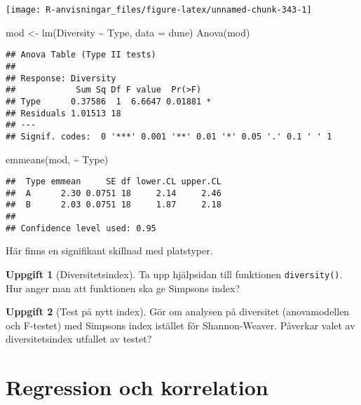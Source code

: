 \documentclass[
]{book}
\newenvironment{Shaded}{\begin{snugshade}}{\end{snugshade}}
\newcommand{\AttributeTok}[1]{\textcolor[rgb]{0.77,0.63,0.00}{#1}}
\newcommand{\FunctionTok}[1]{\textcolor[rgb]{0.00,0.00,0.00}{#1}}
\newcommand{\NormalTok}[1]{#1}
\newcommand{\OtherTok}[1]{\textcolor[rgb]{0.56,0.35,0.01}{#1}}
\newcommand{\SpecialCharTok}[1]{\textcolor[rgb]{0.00,0.00,0.00}{#1}}
\theoremstyle{definition}
\theoremstyle{definition}
\theoremstyle{definition}
\newtheorem{exercise}{Uppgift}[chapter]
\theoremstyle{definition}
\theoremstyle{remark}
\begin{document}
\begin{center}\texttt{[image: R-anvisningar\_files/figure-latex/unnamed-chunk-343-1]} \end{center}

\begin{Shaded}
\begin{Highlighting}[]
\NormalTok{mod }\OtherTok{\textless{}{-}} \FunctionTok{lm}\NormalTok{(Diversity }\SpecialCharTok{\textasciitilde{}}\NormalTok{ Type, }\AttributeTok{data =}\NormalTok{ dune)}
\FunctionTok{Anova}\NormalTok{(mod)}
\end{Highlighting}
\end{Shaded}

\begin{verbatim}
## Anova Table (Type II tests)
## 
## Response: Diversity
##            Sum Sq Df F value  Pr(>F)  
## Type      0.37586  1  6.6647 0.01881 *
## Residuals 1.01513 18                  
## ---
## Signif. codes:  0 '***' 0.001 '**' 0.01 '*' 0.05 '.' 0.1 ' ' 1
\end{verbatim}

\begin{Shaded}
\begin{Highlighting}[]
\FunctionTok{emmeans}\NormalTok{(mod, }\SpecialCharTok{\textasciitilde{}}\NormalTok{ Type)}
\end{Highlighting}
\end{Shaded}

\begin{verbatim}
##  Type emmean     SE df lower.CL upper.CL
##  A      2.30 0.0751 18     2.14     2.46
##  B      2.03 0.0751 18     1.87     2.18
## 
## Confidence level used: 0.95
\end{verbatim}

Här finns en signifikant skillnad med platstyper.

\begin{exercise}[Diversitetsindex]
Ta upp hjälpsidan till funktionen \texttt{diversity()}. Hur anger man att funktionen ska ge Simpsons index?
\end{exercise}

\begin{exercise}[Test på nytt index]
Gör om analysen på diversitet (anovamodellen och F-testet) med Simpsons index istället för Shannon-Weaver. Påverkar valet av diversitetsindex utfallet av testet?
\end{exercise}

\hypertarget{regression-och-korrelation}{%
\chapter{Regression och korrelation}\label{regression-och-korrelation}}
\end{document}
